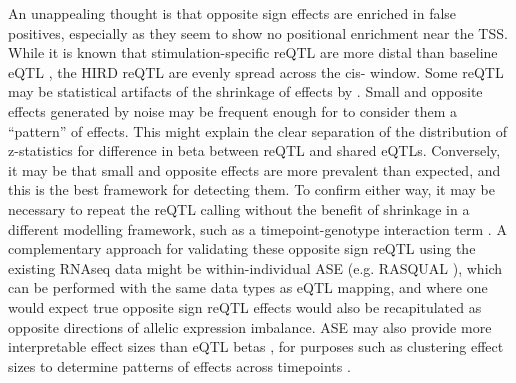 An unappealing thought is that opposite sign effects are enriched in false positives, especially as they seem to show no positional enrichment near the \gls{TSS}.
While it is known that stimulation-specific \gls{reQTL} are more distal than baseline eQTL \autocite{fairfax2014InnateImmuneActivity}, the \gls{HIRD} reQTL are evenly spread across the cis- window.
Some reQTL may be statistical artifacts of the shrinkage of effects by .
Small and opposite effects generated by noise may be frequent enough for  to consider them a \enquote{pattern} of effects.
This might explain the clear separation of the distribution of z-statistics for difference in beta between \gls{reQTL} and shared eQTLs.
Conversely, it may be that small and opposite effects are more prevalent than expected, and this is the best framework for detecting them.
To confirm either way, it may be necessary to repeat the \gls{reQTL} calling without the benefit of  shrinkage in a different modelling framework,
such as a timepoint-genotype interaction term \autocite{davenport2018DiscoveringVivoCytokineeQTL}.
A complementary approach for validating these opposite sign \gls{reQTL} using the existing \gls{RNAseq} data might be within-individual \gls{ASE} (e.g. RASQUAL \autocite{kumasaka2016FinemappingCellularQTLs}),
which can be performed with the same data types as \gls{eQTL} mapping,
and where one would expect true opposite sign \gls{reQTL} effects would also be recapitulated as opposite directions of allelic expression imbalance.
\gls{ASE} may also provide more interpretable effect sizes than \gls{eQTL} betas \autocite{mohammadi2017QuantifyingRegulatoryEffect},
for purposes such as clustering effect sizes to determine patterns of effects across timepoints \autocite{cuomo2020SinglecellRNAsequencingDifferentiating}.

